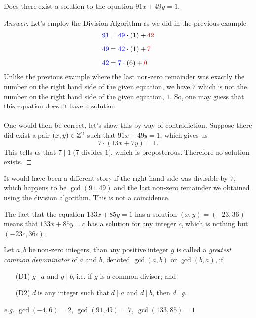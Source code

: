 
\begin{example}
Does there exist a solution to the equation $91x + 49y = 1$.
\end{example}
\begin{proof}[Answer]
Let's employ the Division Algorithm as we did in the previous example
\begin{align*}
{\color{blue} 91} &= {\color{blue} 49}\cdot (1) + {\color{red} 42}\\[0.5em]
{\color{blue} 49} &= {\color{blue} 42}\cdot (1) + {\color{red} 7}\\[0.5em]
{\color{blue} 42} &= {\color{blue} 7}\cdot (6) + {\color{red} 0}
\end{align*}
Unlike the previous example where the last non-zero remainder was exactly the number on the right hand side of the given equation, we have $7$ which is not the number on the right hand side of the given equation, $1$. So, one may guess that this equation doesn't have a solution.\\
\\
One would then be correct, let's show this by way of contradiction. Suppose there did exist a pair $(x,y) \in \mathbb Z^2$ such that $91x + 49y = 1$, which gives us
\[7\cdot (13x + 7y) = 1.\]
This tells us that $7 \mid 1$ ($7$ divides $1$), which is preposterous. Therefore no solution exists.
\end{proof}

It would have been a different story if the right hand side was divisible by $7$, which happens to be $\gcd(91,49)$ and the last non-zero remainder we obtained using the division algorithm. This is not a coincidence.

\vspace*{1.5em}

\begin{remark}
The fact that the equation $133x + 85y = 1$ has a solution $(x,y) = (-23,36)$ means that $133x + 85y = c$ has a solution for any integer $c$, which is nothing but $(-23c,36c)$.
\end{remark}

\vspace*{1em}

\begin{definition}
Let $a,b$ be non-zero integers, than any positive integer $g$ is called a \emph{greatest common denominator} of $a$ and $b$, denoted $\gcd(a,b)$ or $\gcd(b,a)$, if
\begin{itemize}
\item[(D1)] $g\mid a$ and $g\mid b$, i.e. if $g$ is a common divisor; and
\item[(D2)] $d$ is any integer such that $d\mid a$ and $d\mid b$, then $d\mid g$.
\end{itemize}
\vspace{0.5em}
\emph{e.g.} $\gcd(-4,6) = 2,\ \gcd(91,49) = 7,\ \gcd(133,85) = 1$
\end{definition}


